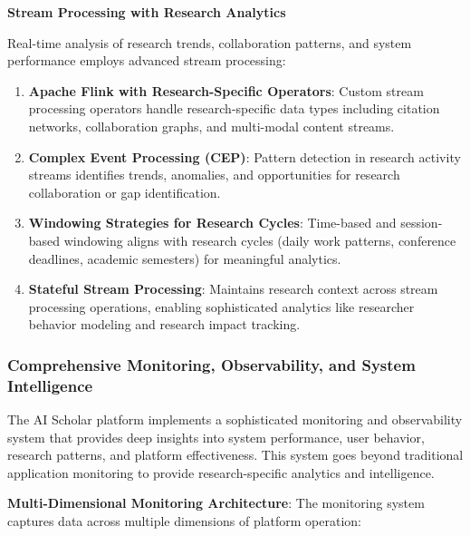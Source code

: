 \documentclass[10pt,twocolumn]{article}
\begin{document}
\textbf{Stream Processing with Research Analytics}

Real-time analysis of research trends, collaboration patterns, and system performance employs advanced stream processing:

\begin{enumerate}
    \item \textbf{Apache Flink with Research-Specific Operators}: Custom stream processing operators handle research-specific data types including citation networks, collaboration graphs, and multi-modal content streams.
    
    \item \textbf{Complex Event Processing (CEP)}: Pattern detection in research activity streams identifies trends, anomalies, and opportunities for research collaboration or gap identification.
    
    \item \textbf{Windowing Strategies for Research Cycles}: Time-based and session-based windowing aligns with research cycles (daily work patterns, conference deadlines, academic semesters) for meaningful analytics.
    
    \item \textbf{Stateful Stream Processing}: Maintains research context across stream processing operations, enabling sophisticated analytics like researcher behavior modeling and research impact tracking.
\end{enumerate}

\subsubsection{Comprehensive Monitoring, Observability, and System Intelligence}

The AI Scholar platform implements a sophisticated monitoring and observability system that provides deep insights into system performance, user behavior, research patterns, and platform effectiveness. This system goes beyond traditional application monitoring to provide research-specific analytics and intelligence.

\textbf{Multi-Dimensional Monitoring Architecture}: The monitoring system captures data across multiple dimensions of platform operation:
\end{document}
